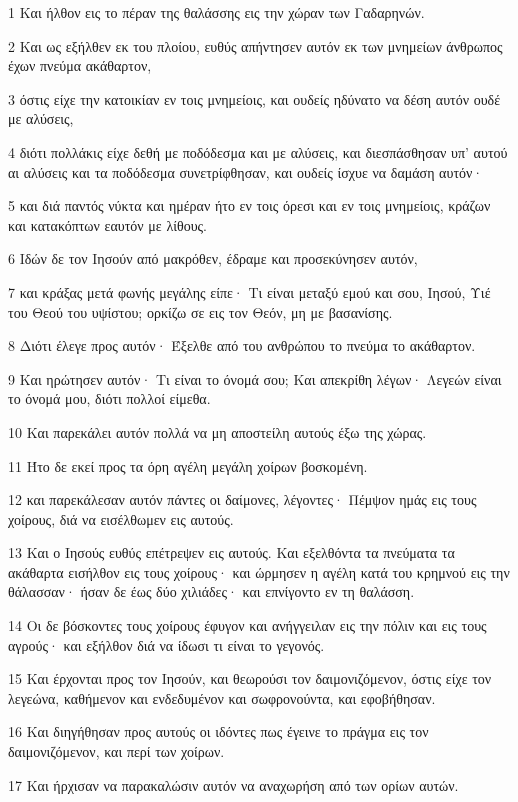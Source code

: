 \par 1 Και ήλθον εις το πέραν της θαλάσσης εις την χώραν των Γαδαρηνών.
\par 2 Και ως εξήλθεν εκ του πλοίου, ευθύς απήντησεν αυτόν εκ των μνημείων άνθρωπος έχων πνεύμα ακάθαρτον,
\par 3 όστις είχε την κατοικίαν εν τοις μνημείοις, και ουδείς ηδύνατο να δέση αυτόν ουδέ με αλύσεις,
\par 4 διότι πολλάκις είχε δεθή με ποδόδεσμα και με αλύσεις, και διεσπάσθησαν υπ' αυτού αι αλύσεις και τα ποδόδεσμα συνετρίφθησαν, και ουδείς ίσχυε να δαμάση αυτόν·
\par 5 και διά παντός νύκτα και ημέραν ήτο εν τοις όρεσι και εν τοις μνημείοις, κράζων και κατακόπτων εαυτόν με λίθους.
\par 6 Ιδών δε τον Ιησούν από μακρόθεν, έδραμε και προσεκύνησεν αυτόν,
\par 7 και κράξας μετά φωνής μεγάλης είπε· Τι είναι μεταξύ εμού και σου, Ιησού, Υιέ του Θεού του υψίστου; ορκίζω σε εις τον Θεόν, μη με βασανίσης.
\par 8 Διότι έλεγε προς αυτόν· Έξελθε από του ανθρώπου το πνεύμα το ακάθαρτον.
\par 9 Και ηρώτησεν αυτόν· Τι είναι το όνομά σου; Και απεκρίθη λέγων· Λεγεών είναι το όνομά μου, διότι πολλοί είμεθα.
\par 10 Και παρεκάλει αυτόν πολλά να μη αποστείλη αυτούς έξω της χώρας.
\par 11 Ήτο δε εκεί προς τα όρη αγέλη μεγάλη χοίρων βοσκομένη.
\par 12 και παρεκάλεσαν αυτόν πάντες οι δαίμονες, λέγοντες· Πέμψον ημάς εις τους χοίρους, διά να εισέλθωμεν εις αυτούς.
\par 13 Και ο Ιησούς ευθύς επέτρεψεν εις αυτούς. Και εξελθόντα τα πνεύματα τα ακάθαρτα εισήλθον εις τους χοίρους· και ώρμησεν η αγέλη κατά του κρημνού εις την θάλασσαν· ήσαν δε έως δύο χιλιάδες· και επνίγοντο εν τη θαλάσση.
\par 14 Οι δε βόσκοντες τους χοίρους έφυγον και ανήγγειλαν εις την πόλιν και εις τους αγρούς· και εξήλθον διά να ίδωσι τι είναι το γεγονός.
\par 15 Και έρχονται προς τον Ιησούν, και θεωρούσι τον δαιμονιζόμενον, όστις είχε τον λεγεώνα, καθήμενον και ενδεδυμένον και σωφρονούντα, και εφοβήθησαν.
\par 16 Και διηγήθησαν προς αυτούς οι ιδόντες πως έγεινε το πράγμα εις τον δαιμονιζόμενον, και περί των χοίρων.
\par 17 Και ήρχισαν να παρακαλώσιν αυτόν να αναχωρήση από των ορίων αυτών.
